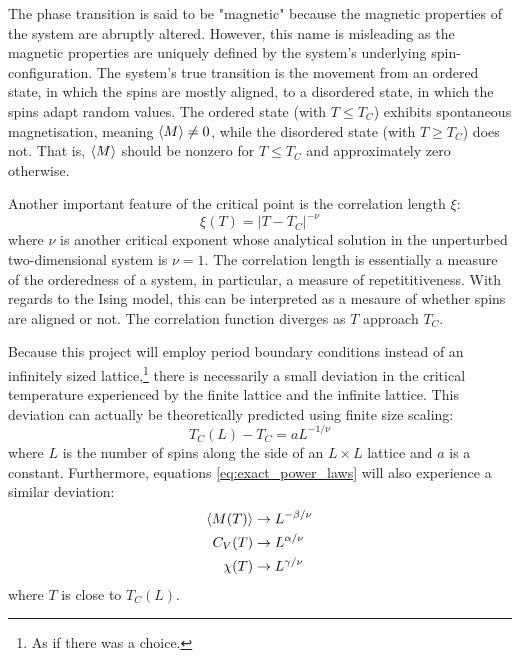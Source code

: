 \documentclass[nofootinbib,reprint,english]{revtex4-1}
\begin{document}
The phase transition is said to be "magnetic" because the magnetic properties of the system are abruptly altered. However, this name is misleading as the magnetic properties are uniquely defined by the system's underlying spin-configuration. The system's true transition is the movement from an ordered state, in which the spins are mostly aligned, to a disordered state, in which the spins adapt random values. The ordered state (with \(T\leq T_C\)) exhibits spontaneous magnetisation, meaning \(\expval{M}\neq0\), while the disordered state (with \(T\geq T_C\)) does not. That is, \(\expval{M}\) should be nonzero for \(T\leq T_C\) and approximately zero otherwise. 

Another important feature of the critical point is the correlation length \(\xi\):
\begin{equation}
\xi(T)=|T-T_C|^{-\nu}
\end{equation}
where \(\nu\) is another critical exponent whose analytical solution in the unperturbed two-dimensional system is \(\nu=1\). The correlation length is essentially a measure of the orderedness of a system, in particular, a measure of repetititiveness. With regards to the Ising model, this can be interpreted as a mesaure of whether spins are aligned or not. The correlation function diverges as \(T\) approach \(T_C\).

Because this project will employ period boundary conditions instead of an infinitely sized lattice,\footnote{As if there was a choice.} there is necessarily a small deviation in the critical temperature experienced by the finite lattice and the infinite lattice. This deviation can actually be theoretically predicted using finite size scaling:
\begin{equation}\label{eq:ideal_critical_temperature_scale}
T_C(L)-T_C=aL^{-1/\nu}
\end{equation}
where \(L\) is the number of spins along the side of an \(L\times L\) lattice and \(a\) is a constant. Furthermore, equations \ref{eq:exact_power_laws} will also experience a similar deviation:
\begin{subequations}\label{eq:scaled_power_laws}
\begin{align}
\expval{M(T)}&\to L^{-\beta/\nu}\\
C_V(T)&\to L^{\alpha/\nu}\\
\chi(T)&\to L^{\gamma/\nu}
\end{align}
\end{subequations}
where \(T\) is close to \(T_C(L)\).
\end{document}
